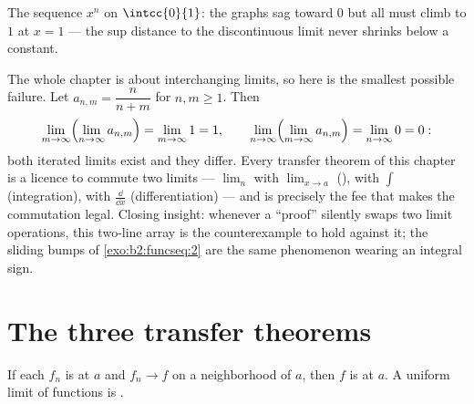 \begin{omfigure}

{\small The sequence $x^n$ on $\intcc{0}{1}$: the graphs sag toward
$0$ but all must climb to $1$ at $x = 1$ --- the sup distance to the
discontinuous  limit never shrinks below a constant.}
\end{omfigure}

\begin{example}\label{ex:b2:funcseq:doublelimit}
The whole chapter is about interchanging limits, so here is the
smallest possible failure. Let $a_{n,m} = \dfrac{n}{n+m}$ for
$n, m \geq 1$. Then
\[
\lim_{m\to\infty}\Bigl(\lim_{n\to\infty}a_{n,m}\Bigr)
= \lim_{m\to\infty} 1 = 1,
\qquad
\lim_{n\to\infty}\Bigl(\lim_{m\to\infty}a_{n,m}\Bigr)
= \lim_{n\to\infty} 0 = 0 :
\]
both iterated limits exist and they differ. Every transfer
theorem of this chapter is a licence to commute two limits ---
$\lim_n$ with $\lim_{x\to a}$ (), with $\int$
(integration), with $\frac{\dd}{\dd x}$ (differentiation) ---
and  is precisely the fee that makes the
commutation legal. Closing insight: whenever a ``proof''
silently swaps two limit operations, this two-line array is
the counterexample to hold against it; the sliding bumps of
\cref{exo:b2:funcseq:2} are the same phenomenon wearing an
integral sign.
\end{example}

\section{The three transfer theorems}

\begin{theorem}[Continuity]\label{thm:b2:funcseq:continuity}
If each $f_n$ is  at $a$ and $f_n \to f$  on a
neighborhood of $a$, then $f$ is  at $a$. A uniform limit
of  functions is .
\end{theorem}


